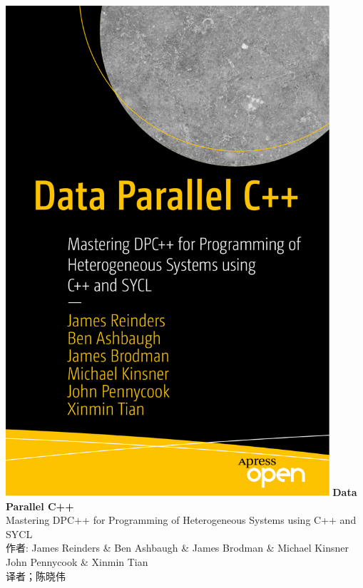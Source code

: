 \documentclass[11pt,a4paper,UTF8]{ctexart}
\begin{document}
	
	\begin{center}
		\includegraphics[width=0.9\textwidth]{images/cover}
		\newpage
		\huge
		\textbf{Data Parallel C++} 
		\\[9pt]
		\normalsize
		Mastering DPC++ for Programming of Heterogeneous Systems using C++ and SYCL
		\\[10pt]
		\normalsize 
		作者: James Reinders \&
		Ben Ashbaugh \&
		James Brodman \&
		Michael Kinsner \\
		John Pennycook \&
		Xinmin Tian
		\\[8pt]
		\normalsize
		译者；陈晓伟
	\end{center}
	
\end{document}
